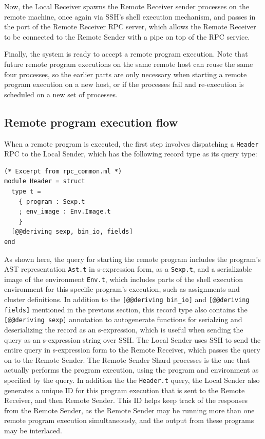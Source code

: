 \documentclass[twoside]{report}
\begin{document}
Now, the Local Receiver spawns the Remote Receiver sender processes on the remote machine, once again via SSH's shell execution mechanism, and passes in the port of the Remote Receiver RPC server, which allows the Remote Receiver to be connected to the Remote Sender with a pipe on top of the RPC service.

Finally, the system is ready to accept a remote program execution.
Note that future remote program executions on the same remote host can reuse the same four processes, so the earlier parts are only necessary when starting a remote program execution on a new host, or if the processes fail and re-execution is scheduled on a new set of processes.

\subsection{Remote program execution flow}

When a remote program is executed, the first step involves dispatching a \texttt{Header} RPC to the Local Sender, which has the following record type as its query type:

\begin{minipage}[c]{\textwidth-15pt}
  \begin{lstlisting}
(* Excerpt from rpc_common.ml *)
module Header = struct
  type t =
    { program : Sexp.t
    ; env_image : Env.Image.t
    }
  [@@deriving sexp, bin_io, fields]
end
\end{lstlisting}
  \smallskip
\end{minipage}

As shown here, the query for starting the remote program includes the program's AST representation \texttt{Ast.t} in s-expression form, as a \texttt{Sexp.t}, and a serializable image of the environment \texttt{Env.t}, which includes parts of the shell execution environment for this specific program's execution, such as assignments and cluster definitions.
In addition to the \texttt{[@@deriving bin\_io]} and \texttt{[@@deriving fields]} mentioned in the previous section, this record type also contains the \texttt{[@@deriving sexp]} annotation to autogenerate functions for serialzing and deserializing the record as an s-expression, which is useful when sending the query as an s-expression string over SSH.
The Local Sender uses SSH to send the entire query in s-expression form to the Remote Receiver, which passes the query on to the Remote Sender.
The Remote Sender Shard processes is the one that actually performs the program execution, using the program and environment as specified by the query.
In addition the the \texttt{Header.t} query, the Local Sender also generates a unique ID for this program execution that is sent to the Remote Receiver, and then Remote Sender.
This ID helps keep track of the responses from the Remote Sender, as the Remote Sender may be running more than one remote program execution simultaneously, and the output from these programs may be interlaced.
\end{document}
